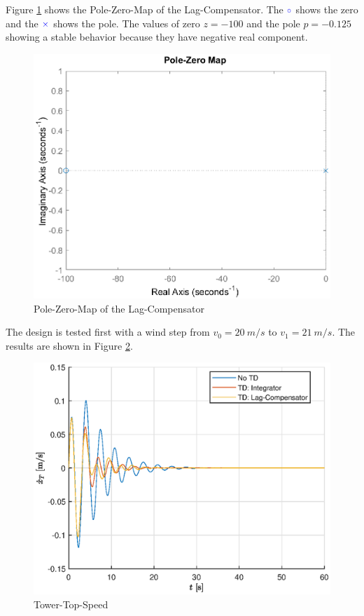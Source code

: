 Figure \ref{fig:ZeroPoleLag} shows the Pole-Zero-Map of the Lag-Compensator. The $\color{blue} \circ$ shows the zero and the $\color{blue} \times$ shows the pole. The values of zero $z = -100$ and the pole $p = -0.125$ showing a stable behavior because they have negative real component.

\begin{figure}[h]
	\centering	
	\includegraphics[width=12cm]{Figures/PoleZeroMapLagCompensator.eps}
	\caption{Pole-Zero-Map of the Lag-Compensator}
	\label{fig:ZeroPoleLag}
\end{figure} 

The design is tested first with a wind step from $v_0 = \SI{20}{m/s}$ to $v_1 = \SI{21}{m/s}$. The results are shown in Figure \ref{fig:TDWindStep}.

\begin{figure}[h]
	\centering	
	\includegraphics[width=12cm]{Figures/WindStep.eps}
	\caption{Tower-Top-Speed}
	\label{fig:TDWindStep}
\end{figure}
 
